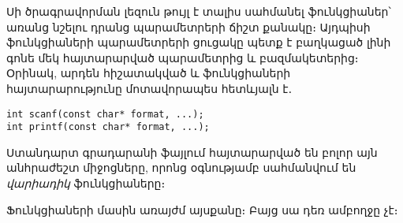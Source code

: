 
Սի ծրագրավորման լեզուն թույլ է տալիս սահմանել ֆունկցիաներ՝ առանց նշելու
դրանց պարամետրերի ճիշտ քանակը։ Այդպիսի ֆունկցիաների պարամետրերի ցուցակը
պետք է բաղկացած լինի գոնե մեկ հայտարարված պարամետրից և բազմակետերից։
Օրինակ, արդեն հիշատակված  և  ֆունկցիաների
հայտարարությունը մոտավորապես հետևյալն է․

\begin{Verbatim}
int scanf(const char* format, ...);
int printf(const char* format, ...);
\end{Verbatim}

Ստանդարտ գրադարանի  ֆայլում հայտարարված են բոլոր այն
անհրաժեշտ միջոցները, որոնց օգնությամբ սահմանվում են \emph{վարիադիկ}
ֆունկցիաները։

Ֆունկցիաների մասին առայժմ այսքանը։ Բայց սա դեռ ամբողջը չէ։
